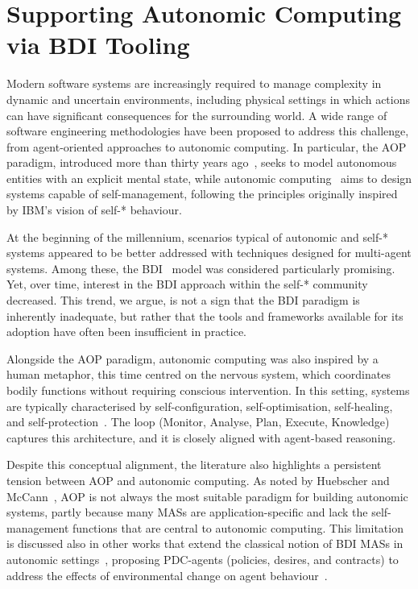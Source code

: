 \chapter{Supporting Autonomic Computing via BDI Tooling}

Modern software systems are increasingly required to manage complexity in dynamic and uncertain environments,
including physical settings in which actions can have significant consequences for the surrounding world.
A wide range of software engineering methodologies have been proposed to address this challenge,
from agent-oriented approaches to autonomic computing.
In particular, the \ac{AOP} paradigm, introduced more than thirty years ago~\cite{DBLP:journals/ai/Shoham93},
seeks to model autonomous entities with an explicit mental state,
while autonomic computing~\cite{DBLP:journals/computer/KephartC03} aims to design systems capable of self-management,
following the principles originally inspired by IBM's vision of self-* behaviour.

At the beginning of the millennium,
scenarios typical of autonomic and self-* systems appeared to be better addressed with techniques designed for multi-agent systems.
Among these, the \ac{BDI}~\cite{DBLP:conf/kr/RaoG91} model was considered particularly promising.
Yet, over time, interest in the \ac{BDI} approach within the self-* community decreased.
This trend, we argue, is not a sign that the \ac{BDI} paradigm is inherently inadequate,
but rather that the tools and frameworks available for its adoption have often been insufficient in practice.

Alongside the \ac{AOP} paradigm, autonomic computing was also inspired by a human metaphor,
this time centred on the nervous system,
which coordinates bodily functions without requiring conscious intervention.
In this setting, systems are typically characterised by self-configuration,
self-optimisation, self-healing, and self-protection~\cite{DBLP:journals/csur/HuebscherM08}.
The \mapek{} loop (Monitor, Analyse, Plan, Execute, Knowledge) captures this architecture,
and it is closely aligned with agent-based reasoning.

Despite this conceptual alignment, the literature also highlights a persistent tension between \ac{AOP} and autonomic computing.
As noted by Huebscher and McCann~\cite{DBLP:journals/csur/HuebscherM08}, \ac{AOP} is not always the most suitable paradigm for building autonomic systems,
partly because many \acp{MAS} are application-specific and lack the self-management functions that are central to autonomic computing.
This limitation is discussed also in other works that extend the classical notion of \ac{BDI} \acp{MAS} in autonomic settings~\cite{DBLP:conf/prima/LiaoJG06},
proposing PDC-agents (policies, desires, and contracts) to address the effects of environmental change on agent behaviour~\cite{DBLP:conf/smc/JunJZBCJ04}.

